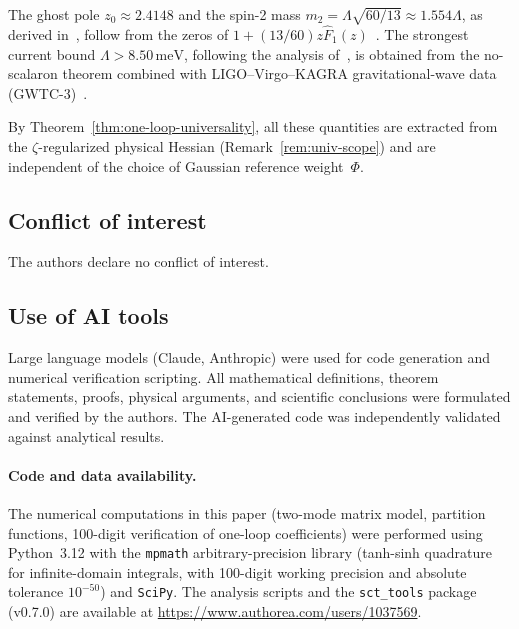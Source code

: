 \documentclass[12pt,a4paper]{article}
\theoremstyle{plain}
\theoremstyle{definition}
\theoremstyle{remark}
\newcommand{\Lam}{\Lambda}
\begin{document}
The ghost pole $z_0 \approx 2.4148$ and the spin-2 mass
$m_2 = \Lam\sqrt{60/13} \approx 1.554\Lam$, as derived
in~\cite{Alfyorov:2026ff}, follow from the zeros of
$1 + (13/60)z\hat F_1(z)$~\cite{CZ:2013,Alfyorov:2026ff}.
The strongest current bound $\Lam > 8.50\,\mathrm{meV}$, following
the analysis of~\cite{Alfyorov:2026ss}, is obtained
from the no-scalaron theorem combined with LIGO--Virgo--KAGRA
gravitational-wave data (GWTC-3)~\cite{Alfyorov:2026ss}.

By Theorem~\ref{thm:one-loop-universality}, all these quantities are
extracted from the $\zeta$-regularized physical Hessian
(Remark~\ref{rem:univ-scope}) and are independent of the choice of
Gaussian reference weight~$\Phi$.


\subsection*{Conflict of interest}
The authors declare no conflict of interest.

\subsection*{Use of AI tools}
Large language models (Claude, Anthropic) were used for code generation
and numerical verification scripting.
All mathematical definitions, theorem statements, proofs, physical
arguments, and scientific conclusions were formulated and verified by the
authors.  The AI-generated code was independently validated against
analytical results.

\paragraph{Code and data availability.}
The numerical computations in this paper (two-mode matrix model,
partition functions, 100-digit verification of one-loop coefficients)
were performed using Python~3.12 with the \texttt{mpmath}
arbitrary-precision library (tanh-sinh quadrature for infinite-domain
integrals, with 100-digit working precision and absolute tolerance
$10^{-50}$) and \texttt{SciPy}.  The analysis scripts and the
\texttt{sct\_tools} package (v0.7.0) are available at
\url{https://www.authorea.com/users/1037569}.



\end{document}
